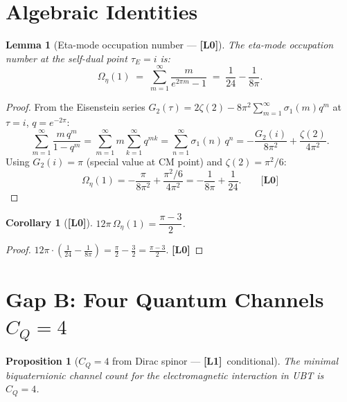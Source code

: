 \documentclass[12pt,a4paper]{article}
\newtheorem{lemma}[theorem]{Lemma}
\newtheorem{proposition}[theorem]{Proposition}
\newtheorem{corollary}[theorem]{Corollary}
\theoremstyle{definition}\newtheorem{definition}[theorem]{Definition}
\theoremstyle{remark}\newtheorem{remark}[theorem]{Remark}
\newcommand{\Lz}{\textbf{[L0]}}
\newcommand{\Lo}{\textbf{[L1]}}
\begin{document}
\section{Algebraic Identities}
\label{sec:identities}

\begin{lemma}[Eta-mode occupation number — \Lz]
\label{lem:omega_eta}
The eta-mode occupation number at the self-dual point $\tau_E = i$
is:
\[
  \Omega_\eta(1)
  \;=\;
  \sum_{m=1}^\infty \frac{m}{e^{2\pi m}-1}
  \;=\;
  \frac{1}{24} - \frac{1}{8\pi}.
\]
\end{lemma}

\begin{proof}
From the Eisenstein series $G_2(\tau) = 2\zeta(2) - 8\pi^2
\sum_{m=1}^\infty \sigma_1(m) q^m$ at $\tau = i$, $q = e^{-2\pi}$:
\[
  \sum_{m=1}^\infty \frac{m\,q^m}{1-q^m}
  = \sum_{m=1}^\infty m \sum_{k=1}^\infty q^{mk}
  = \sum_{n=1}^\infty \sigma_1(n)\,q^n
  = -\frac{G_2(i)}{8\pi^2} + \frac{\zeta(2)}{4\pi^2}.
\]
Using $G_2(i) = \pi$ (special value at CM point) and
$\zeta(2) = \pi^2/6$:
\[
  \Omega_\eta(1) = -\frac{\pi}{8\pi^2} + \frac{\pi^2/6}{4\pi^2}
  = -\frac{1}{8\pi} + \frac{1}{24}. \qquad \Lz
\]
\end{proof}

\begin{corollary}[\Lz]
\label{cor:12pi_omega}
$12\pi\,\Omega_\eta(1) = \dfrac{\pi-3}{2}$.
\end{corollary}

\begin{proof}
$12\pi\cdot(\tfrac{1}{24}-\tfrac{1}{8\pi})
= \tfrac{\pi}{2} - \tfrac{3}{2} = \tfrac{\pi-3}{2}$. \Lz
\end{proof}

\section{Gap B: Four Quantum Channels $C_Q = 4$}
\label{sec:gap_B}

\begin{proposition}[$C_Q = 4$ from Dirac spinor — \Lo\ conditional]
\label{prop:CQ4}
The minimal biquaternionic channel count for the electromagnetic
interaction in UBT is $C_Q = 4$.
\end{proposition}
\end{document}
